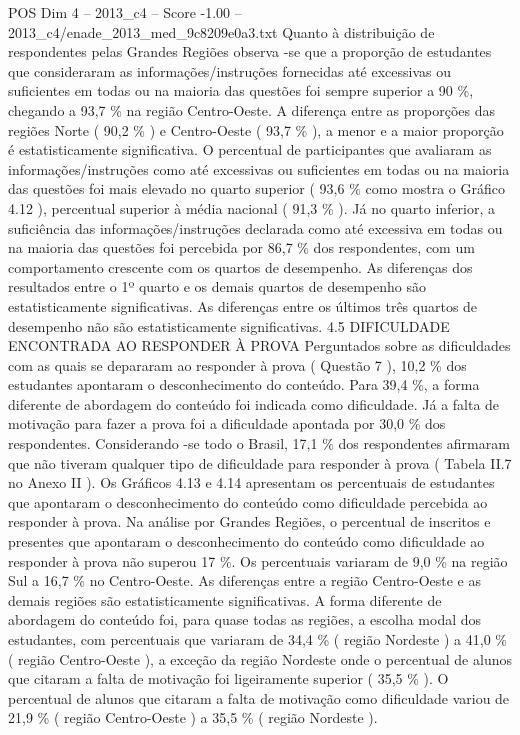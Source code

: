 \begin{textsample}{POS Dim 4 – 2013\_c4 – Score -1.00 – 2013\_c4/enade\_2013\_med\_9c8209e0a3.txt}
Quanto à distribuição de respondentes pelas Grandes Regiões observa -se que a proporção de estudantes que consideraram as informações/instruções fornecidas até excessivas ou suficientes em todas ou na maioria das questões foi sempre superior a 90 \%, chegando a 93,7 \% na região Centro-Oeste.
A diferença entre as proporções das regiões Norte ( 90,2 \% ) e Centro-Oeste ( 93,7 \% ), a menor e a maior proporção é estatisticamente significativa.
O percentual de participantes que avaliaram as informações/instruções como até excessivas ou suficientes em todas ou na maioria das questões foi mais elevado no quarto superior ( 93,6 \% como mostra o Gráfico 4.12 ), percentual superior à média nacional ( 91,3 \% ).
Já no quarto inferior, a suficiência das informações/instruções declarada como até excessiva em todas ou na maioria das questões foi percebida por 86,7 \% dos respondentes, com um comportamento crescente com os quartos de desempenho.
As diferenças dos resultados entre o 1º quarto e os demais quartos de desempenho são estatisticamente significativas.
As diferenças entre os últimos três quartos de desempenho não são estatisticamente significativas. 4.5 DIFICULDADE ENCONTRADA AO RESPONDER À PROVA Perguntados sobre as dificuldades com as quais se depararam ao responder à prova ( Questão 7 ), 10,2 \% dos estudantes apontaram o desconhecimento do conteúdo.
Para 39,4 \%, a forma diferente de abordagem do conteúdo foi indicada como dificuldade.
Já a falta de motivação para fazer a prova foi a dificuldade apontada por 30,0 \% dos respondentes.
Considerando -se todo o Brasil, 17,1 \% dos respondentes afirmaram que não tiveram qualquer tipo de dificuldade para responder à prova ( Tabela II.7 no Anexo II ).
Os Gráficos 4.13 e 4.14 apresentam os percentuais de estudantes que apontaram o desconhecimento do conteúdo como dificuldade percebida ao responder à prova.
Na análise por Grandes Regiões, o percentual de inscritos e presentes que apontaram o desconhecimento do conteúdo como dificuldade ao responder à prova não superou 17 \%.
Os percentuais variaram de 9,0 \% na região Sul a 16,7 \% no Centro-Oeste.
As diferenças entre a região Centro-Oeste e as demais regiões são estatisticamente significativas.
A forma diferente de abordagem do conteúdo foi, para quase todas as regiões, a escolha modal dos estudantes, com percentuais que variaram de 34,4 \% ( região Nordeste ) a 41,0 \% ( região Centro-Oeste ), a exceção da região Nordeste onde o percentual de alunos que citaram a falta de motivação foi ligeiramente superior ( 35,5 \% ).
O percentual de alunos que citaram a falta de motivação como dificuldade variou de 21,9 \% ( região Centro-Oeste ) a 35,5 \% ( região Nordeste ).

\end{textsample}
